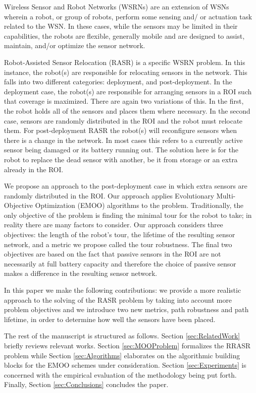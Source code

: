 \documentclass[conference]{IEEEtran}
\begin{document}
Wireless Sensor and Robot Networks (WSRNs) are an extension of WSNs wherein a robot, or group of robots, perform some sensing and/ or actuation task related to the WSN. In these cases, while the sensors may be limited in their capabilities, the robots are flexible, generally mobile and are designed to assist, maintain, and/or optimize the sensor network. 

Robot-Assisted Sensor Relocation (RASR) is a specific WSRN problem. In this instance, the robot(s) are responsible for relocating sensors in the network. This falls into two different categories: deployment, and post-deployment. In the deployment case, the robot(s) are responsible for arranging sensors in a ROI such that coverage is maximized. There are again two variations of this. In the first, the robot holds all of the sensors and places them where necessary. In the second case, sensors are randomly distributed in the ROI and the robot must relocate them. For post-deployment RASR the robot(s) will reconfigure sensors when there is a change in the network. In most cases this refers to a currently active sensor being damaged or its battery running out. The solution here is for the robot to replace the dead sensor with another, be it from storage or an extra already in the ROI.

We propose an approach to the post-deployment case in which extra sensors are randomly distributed in the ROI. Our approach applies Evolutionary Multi-Objective Optimization (EMOO) algorithms  to the problem. Traditionally, the only objective of the problem is finding the minimal tour for the robot to take; in reality there are many factors to consider. Our approach considers three objectives: the length of the robot's tour, the lifetime of the resulting sensor network, and a metric we propose called the tour robustness. The final two objectives are based on the fact that passive sensors in the ROI are not necessarily at full battery capacity and therefore the choice of passive sensor makes a difference in the resulting sensor network.

In this paper we make the following contributions: we provide a more realistic approach to the solving of the RASR problem by taking into account more problem objectives and we introduce two new metrics, path robustness and path lifetime, in order to determine how well the sensors have been placed.

The rest of the manuscript is structured as follows. Section \ref{sec:RelatedWork} briefly reviews relevant works. Section \ref{sec:MOOProblem} formalizes the RRASR problem while Section \ref{sec:Algorithms} elaborates on the algorithmic building blocks for the EMOO schemes under consideration. Section \ref{sec:Experiments} is concerned with the empirical evaluation of the methodology being put forth. Finally, Section \ref{sec:Conclusions} concludes the paper.
\end{document}
